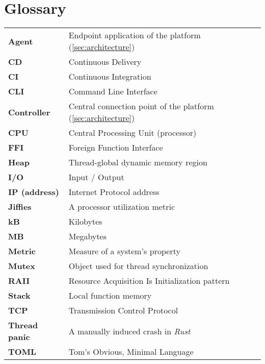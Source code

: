 \section{Glossary}
    \begin{tabular}{ p{3.7cm}|p{11.5cm} }
        \textbf{Agent}          & Endpoint application of the platform (\autoref{sec:architecture})\\
        \textbf{CD}             & Continuous Delivery\\
        \textbf{CI}             & Continuous Integration\\
        \textbf{CLI}            & Command Line Interface\\
        \textbf{Controller}     & Central connection point of the platform (\autoref{sec:architecture})\\
        \textbf{CPU}            & Central Processing Unit (processor)\\
        \textbf{FFI}            & Foreign Function Interface\\
        \textbf{Heap}           & Thread-global dynamic memory region\\
        \textbf{I/O}            & Input / Output\\
        \textbf{IP (address)}   & Internet Protocol address\\
        \textbf{Jiffies}        & A processor utilization metric\\
        \textbf{kB}             & Kilobytes\\
        \textbf{MB}             & Megabytes\\
        \textbf{Metric}         & Measure of a system's property\\
        \textbf{Mutex}          & Object used for thread synchronization\\
        \textbf{RAII}           & Resource Acquisition Is Initialization pattern\\
        \textbf{Stack}          & Local function memory\\
        \textbf{TCP}            & Transmission Control Protocol\\
        \textbf{Thread panic}   & A manually induced crash in \textit{Rust}\\
        \textbf{TOML}           & Tom's Obvious, Minimal Language\\
    \end{tabular}